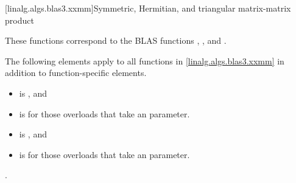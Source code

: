 [linalg.algs.blas3.xxmm]{Symmetric, Hermitian, and triangular matrix-matrix product}

\pnum
\begin{note}
These functions correspond to the BLAS functions
, , and \supercite{blas3}.
\end{note}

\pnum
The following elements apply to all functions in \ref{linalg.algs.blas3.xxmm}
in addition to function-specific elements.

\pnum
\mandates
\begin{itemize}
\item
{}
is , and
\item
{}
is  for those overloads that take an  parameter.
\end{itemize}

\pnum
\expects
\begin{itemize}
\item
{} is , and
\item
{}
is  for those overloads that take an  parameter.
\end{itemize}

\pnum
\complexity
{}.


